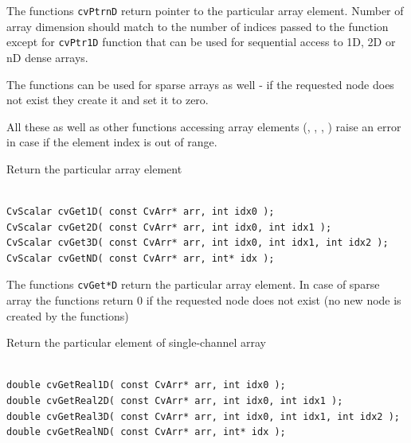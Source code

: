 The functions \texttt{cvPtrnD} return pointer to the particular array element. Number of array dimension should match to the number of indices passed to the function except for \texttt{cvPtr1D} function that can be used for sequential access to 1D, 2D or nD dense arrays.

The functions can be used for sparse arrays as well - if the requested node does not exist they create it and set it to zero.

All these as well as other functions accessing array elements (, , , ) raise an error in case if the element index is out of range.

\label{Get*D}

Return the particular array element

\begin{lstlisting}

CvScalar cvGet1D( const CvArr* arr, int idx0 );
CvScalar cvGet2D( const CvArr* arr, int idx0, int idx1 );
CvScalar cvGet3D( const CvArr* arr, int idx0, int idx1, int idx2 );
CvScalar cvGetND( const CvArr* arr, int* idx );

\end{lstlisting}

\begin{description}
\end{description}


The functions \texttt{cvGet*D} return the particular array element. In case of sparse array the functions return 0 if the requested node does not exist (no new node is created by the functions)

\label{GetReal*D}

Return the particular element of single-channel array

\begin{lstlisting}

double cvGetReal1D( const CvArr* arr, int idx0 );
double cvGetReal2D( const CvArr* arr, int idx0, int idx1 );
double cvGetReal3D( const CvArr* arr, int idx0, int idx1, int idx2 );
double cvGetRealND( const CvArr* arr, int* idx );

\end{lstlisting}

